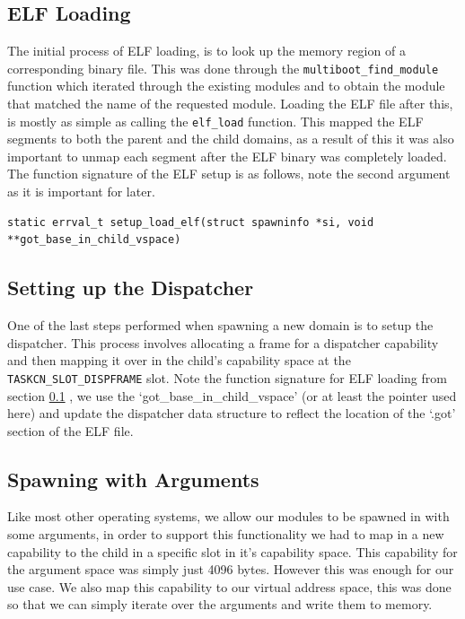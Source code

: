 \subsection{ELF Loading}
\label{sec:elf}
The initial process of ELF loading, is to look up the memory region of a corresponding binary file. This was done through the \texttt{multiboot_find_module} function which iterated through the existing modules and to obtain the module that matched the name of the requested module. Loading the ELF file after this, is mostly as simple as calling the \texttt{elf_load} function. This mapped the ELF segments to both the parent and the child domains, as a result of this it was also important to unmap each segment after the ELF binary was completely loaded. The function signature of the ELF setup is as follows, note the second argument as it is important for later. 
\begin{verbatim}
static errval_t setup_load_elf(struct spawninfo *si, void **got_base_in_child_vspace)
\end{verbatim}

\subsection{Setting up the Dispatcher}
One of the last steps performed when spawning a new domain is to setup the dispatcher. This process involves allocating a frame for a dispatcher capability and then mapping it over in the child's capability space at the \texttt{TASKCN_SLOT_DISPFRAME} slot. Note the function signature for ELF loading from section \ref{sec:elf} , we use the `got\_base\_in\_child\_vspace' (or at least the pointer used here) and update the dispatcher data structure to reflect the location of the `.got' section of the ELF file. 

\subsection{Spawning with Arguments}
Like most other operating systems, we allow our modules to be spawned in with some arguments, in order to support this functionality we had to map in a new capability to the child in a specific slot in it's capability space. This capability for the argument space was simply just 4096 bytes. However this was enough for our use case. We also map this capability to our virtual address space, this was done so that we can simply iterate over the arguments and write them to memory.


